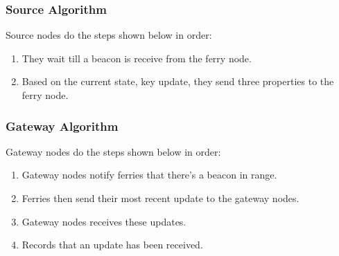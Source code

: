 \subsubsection{Source Algorithm}

Source nodes do the steps shown below in order:

\begin{enumerate}
\item They wait till a beacon is receive from the ferry node.
\item Based on the current state, key update,  they send three properties to the ferry node.

\end{enumerate}


\subsubsection{Gateway Algorithm}

Gateway nodes do the steps shown below in order:

\begin{enumerate}
\item Gateway nodes notify ferries that there's a beacon in range.
\item Ferries then send their most recent update to the gateway nodes.
\item Gateway nodes receives these updates.
\item Records that an update has been received.
\end{enumerate}






